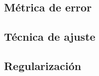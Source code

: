 \documentclass[a4paper, 20pt]{article}
\begin{document}
\subsection{Métrica de error}

\subsection{Técnica de ajuste}


\subsection{Regularización}

\end{document}
